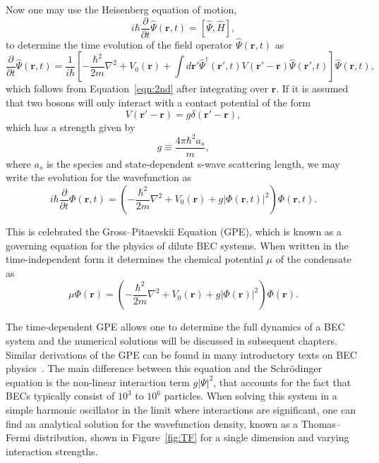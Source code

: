 Now one may use the Heisenberg equation of motion,
\begin{equation}
    i\hbar \frac{\partial}{\partial t}\hat \Psi(\mathbf{r},t) = [\hat \Psi, \hat H],
\end{equation}
    to determine the time evolution of the field operator $\hat \Psi(\mathbf{r},t)$ as
\begin{equation}
    \frac{\partial}{\partial t}\hat \Psi(\mathbf{r},t) = \frac{1}{i\hbar}\left[-\frac{\hbar^2}{2m}\nabla^2 + V_0(\mathbf{r}) + \int d\mathbf{r'} \hat \Psi^\dagger(\mathbf{r'}, t)V(\mathbf{r'} -\mathbf{r})\hat \Psi(\mathbf{r'},t)\right]\hat \Psi(\mathbf{r},t),
\end{equation}
which follows from Equation~\eqref{eqn:2nd} after integrating over $\mathbf{r}$.
If it is assumed that two bosons will only interact with a contact potential of the form
\begin{equation}
V(\mathbf{r'}-\mathbf{r}) = g\delta(\mathbf{r'} - \mathbf{r}),
\end{equation}
which has a strength given by
\begin{equation}
g \equiv \frac{4 \pi \hbar^2 a_s}{m},
\end{equation}
where $a_s$ is the species and state-dependent s-wave scattering length,
we may write the evolution for the wavefunction as
\begin{equation}
    i\hbar \frac{\partial}{\partial t}\Phi(\mathbf{r},t) = \left( - \frac{\hbar^2}{2m} \nabla^2 + V_0(\mathbf{r}) + g |\Phi(\mathbf{r},t)|^2\right)\Phi(\mathbf{r},t).
\end{equation}

\noindent This is celebrated the Gross--Pitaevskii Equation (GPE), which is known as a governing equation for the physics of dilute BEC systems.
When written in the time-independent form it determines the chemical potential $\mu$ of the condensate as~\cite{gross1961, pitaevskii1961}
\begin{equation}
    \mu\Phi(\mathbf{r}) = \left( - \frac{\hbar^2}{2m} \nabla^2 + V_0(\mathbf{r}) + g |\Phi(\mathbf{r})|^2\right)\Phi(\mathbf{r}).
    \label{eqn:GP}
\end{equation}

\noindent The time-dependent GPE allows one to determine the full dynamics of a BEC system and the numerical solutions will be discussed in subsequent chapters.
Similar derivations of the GPE can be found in many introductory texts on BEC physics~\cite{fetter2003, pethick2002, fetter2009}.
The main difference between this equation and the Schr\"odinger equation is the non-linear interaction term $g|\Psi|^2$, that accounts for the fact that BECs typically consist of $10^3$ to $10^6$ particles.
When solving this system in a simple harmonic oscillator in the limit where interactions are significant, one can find an analytical solution for the wavefunction density, known as a Thomas--Fermi distribution, shown in Figure~\ref{fig:TF} for a single dimension and varying interaction strengths.

